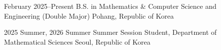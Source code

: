 
\cveducation
  {}
  {February 2025--Present}
  {B.S. in Mathematics \& Computer Science and Engineering (Double Major)}
  {Pohang, Republic of Korea}
  {}
  {}

\cvspace

\cvsecondaryeducation
  {}
  {2025 Summer, 2026 Summer}
  {Summer Session Student, Department of Mathematical Sciences}
  {Seoul, Republic of Korea}
  {}
  {}

